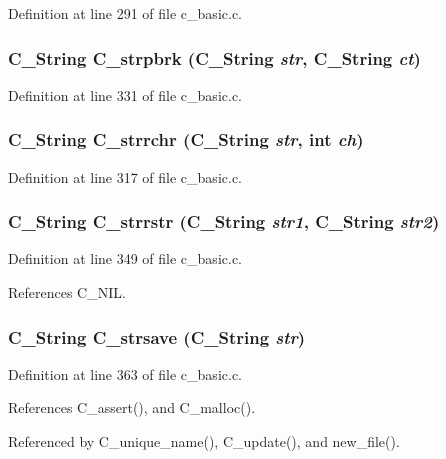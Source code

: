 Definition at line 291 of file c\_\-basic.c.
\subsubsection{\setlength{\rightskip}{0pt plus 5cm}\bf{C\_\-String} C\_\-strpbrk (\bf{C\_\-String} {\em str}, \bf{C\_\-String} {\em ct})}\label{c__basic_8c_e1733cec138a6ba318b540e28a67b43f}




Definition at line 331 of file c\_\-basic.c.
\subsubsection{\setlength{\rightskip}{0pt plus 5cm}\bf{C\_\-String} C\_\-strrchr (\bf{C\_\-String} {\em str}, int {\em ch})}\label{c__basic_8c_95e35beafad545589468e9f746075e32}




Definition at line 317 of file c\_\-basic.c.
\subsubsection{\setlength{\rightskip}{0pt plus 5cm}\bf{C\_\-String} C\_\-strrstr (\bf{C\_\-String} {\em str1}, \bf{C\_\-String} {\em str2})}\label{c__basic_8c_1c8039736bc536e997c59ffc305f80d8}




Definition at line 349 of file c\_\-basic.c.

References C\_\-NIL.
\subsubsection{\setlength{\rightskip}{0pt plus 5cm}\bf{C\_\-String} C\_\-strsave (\bf{C\_\-String} {\em str})}\label{c__basic_8c_c8864a457873c4ff942a2e87ea91f349}




Definition at line 363 of file c\_\-basic.c.

References C\_\-assert(), and C\_\-malloc().

Referenced by C\_\-unique\_\-name(), C\_\-update(), and new\_\-file().
